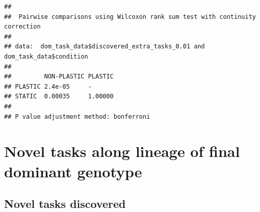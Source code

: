 \documentclass[]{book}
\newenvironment{Shaded}{\begin{snugshade}}{\end{snugshade}}
\newcommand{\DataTypeTok}[1]{\textcolor[rgb]{0.13,0.29,0.53}{#1}}
\newcommand{\FloatTok}[1]{\textcolor[rgb]{0.00,0.00,0.81}{#1}}
\newcommand{\KeywordTok}[1]{\textcolor[rgb]{0.13,0.29,0.53}{\textbf{#1}}}
\newcommand{\NormalTok}[1]{#1}
\newcommand{\OperatorTok}[1]{\textcolor[rgb]{0.81,0.36,0.00}{\textbf{#1}}}
\newcommand{\OtherTok}[1]{\textcolor[rgb]{0.56,0.35,0.01}{#1}}
\newcommand{\StringTok}[1]{\textcolor[rgb]{0.31,0.60,0.02}{#1}}
\begin{document}
\begin{Shaded}
\end{Shaded}

\begin{verbatim}
## 
##  Pairwise comparisons using Wilcoxon rank sum test with continuity correction 
## 
## data:  dom_task_data$discovered_extra_tasks_0.01 and dom_task_data$condition 
## 
##         NON-PLASTIC PLASTIC
## PLASTIC 2.4e-05     -      
## STATIC  0.00035     1.00000
## 
## P value adjustment method: bonferroni
\end{verbatim}

\hypertarget{novel-tasks-along-lineage-of-final-dominant-genotype}{%
\section{Novel tasks along lineage of final dominant genotype}\label{novel-tasks-along-lineage-of-final-dominant-genotype}}

\hypertarget{novel-tasks-discovered}{%
\subsection{Novel tasks discovered}\label{novel-tasks-discovered}}
\end{document}
